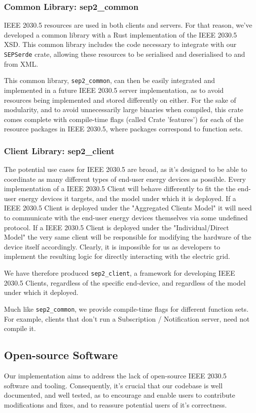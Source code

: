 \subsubsection{Common Library: \- sep2\_common}
IEEE 2030.5 resources are used in both clients and servers. For that reason, we've developed a common library with a Rust implementation of the IEEE 2030.5 XSD. This common library includes the code necessary to integrate with our \texttt{SEPSerde} crate, allowing these resources to be serialised and deserialised to and from XML.

This common library, \texttt{sep2\_common}, can then be easily integrated and implemented in a future IEEE 2030.5 server implementation, as to avoid resources being implemented and stored differently on either. 
For the sake of modularity, and to avoid unnecessarily large binaries when compiled, this crate comes complete with compile-time flags (called Crate 'features') for each of the resource packages in IEEE 2030.5, where packages correspond to function sets.

\subsubsection{Client Library: \- sep2\_client}
The potential use cases for IEEE 2030.5 are broad, as it's designed to be able to coordinate as many different types of end-user energy devices as possible.
Every implementation of a IEEE 2030.5 Client will behave differently to fit the the end-user energy devices it targets, and the model under which it is deployed. 
If a IEEE 2030.5 Client is deployed under the "Aggregated Clients Model" it will need to communicate with the end-user energy devices themselves via some undefined protocol.
If a IEEE 2030.5 Client is deployed under the "Individual/Direct Model" the very same client will be responsible for modifying the hardware of the device itself accordingly. 
Clearly, it is impossible for us as developers to implement the resulting logic for directly interacting with the electric grid.

We have therefore produced \texttt{sep2\_client}, a framework for developing IEEE 2030.5 Clients, regardless of the specific end-device, and regardless of the model under which it deployed.

Much like \texttt{sep2\_common}, we provide compile-time flags for different function sets. For example, clients that don't run a Subscription / Notification server, need not compile it.

\subsection{Open-source Software}
Our implementation aims to address the lack of open-source IEEE 2030.5 software and tooling. Consequently, it's crucial that our codebase is well documented, and well tested, as to encourage and enable users to contribute modifications and fixes, and to reassure potential users of it's correctness.

